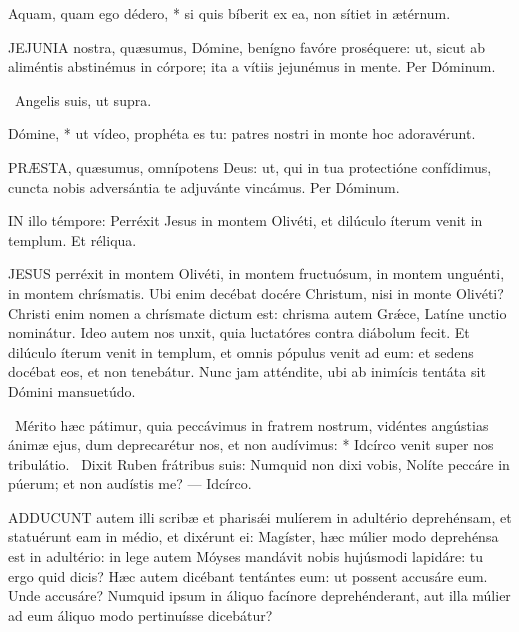  Aquam, quam ego dédero, * si quis bíberit ex ea, non sítiet in ætérnum.


\lettrine[lines=2]{J}{EJUNIA} nostra, quæsumus, Dómine, benígno favóre proséquere: ut, sicut ab aliméntis abstinémus in córpore; ita a vítiis jejunémus in mente. Per Dóminum.

\V\ Angelis suis, ut supra.

 Dómine, * ut vídeo, prophéta es tu: patres nostri in monte hoc adoravérunt.


\lettrine[lines=2]{P}{RÆSTA}, quæsumus, omnípotens Deus: ut, qui in tua protectióne confídimus, cuncta nobis adversántia te adjuvánte vincámus. Per Dóminum.

\sectionornament




\lettrine[lines=2]{I}{N} illo témpore: Perréxit Jesus in montem Olivéti, et dilúculo íterum venit in templum. Et réliqua.



\lettrine[lines=2]{J}{ESUS} perréxit in montem Olivéti, in montem fructuósum, in montem unguénti, in montem chrísmatis. Ubi enim decébat docére Christum, nisi in monte Olivéti? Christi enim nomen a chrísmate dictum est: chrisma autem Grǽce, Latíne unctio nominátur. Ideo autem nos unxit, quia luctatóres contra diábolum fecit. Et dilúculo íterum venit in templum, et omnis pópulus venit ad eum: et sedens docébat eos, et non tenebátur. Nunc jam atténdite, ubi ab inimícis tentáta sit Dómini mansuetúdo.

\R\ Mérito hæc pátimur, quia peccávimus in fratrem nostrum, vidéntes angústias ánimæ ejus, dum deprecarétur nos, et non audívimus: * Idcírco venit super nos tribulátio. \V\ Dixit Ruben frátribus suis: Numquid non dixi vobis, Nolíte peccáre in púerum; et non audístis me? --- Idcírco.


\lettrine[lines=2]{A}{DDUCUNT} autem illi scribæ et pharisǽi mulíerem in adultério deprehénsam, et statuérunt eam in médio, et dixérunt ei: Magíster, hæc múlier modo deprehénsa est in adultério: in lege autem Móyses mandávit nobis hujúsmodi lapidáre: tu ergo quid dicis? Hæc autem dicébant tentántes eum: ut possent accusáre eum. Unde accusáre? Numquid ipsum in áliquo facínore deprehénderant, aut illa múlier ad eum áliquo modo pertinuísse dicebátur?

